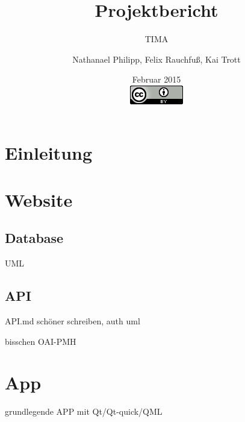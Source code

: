 \documentclass[a4paper, 12pt, oneside]{scrbook}
\author{Nathanael Philipp, Felix Rauchfuß, Kai Trott}
\title{Projektbericht}
\subtitle{TIMA}
\date{Februar 2015\\\vspace{18em}\includegraphics{cc-by.png}}
\begin{document}
\maketitle\newpage
\tableofcontents\newpage
\chapter{Einleitung}

\chapter{Website}
\section{Database}
UML
\section{API}
API.md schöner schreiben, auth uml

bisschen OAI-PMH

\chapter{App}
grundlegende APP mit Qt/Qt-quick/QML

\printbibliography
\end{document}
